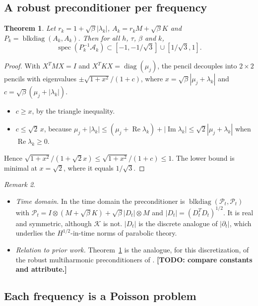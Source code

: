 \documentclass[11pt,a4paper]{article}
\newcommand{\A}{\mathcal{A}}
\newcommand{\todo}[1]{\textbf{[TODO: #1]}}
\newtheorem{theorem}{Theorem}[section]
\theoremstyle{remark}
\newtheorem{remark}[theorem]{Remark}
\begin{document}
\subsection{A robust preconditioner per frequency}

\begin{theorem}\label{thm:heatsz}
Let $r_k=1+\sqrt\beta|\lambda_k|$, $A_k=r_kM+\sqrt\beta K$ and $P_k=\operatorname{blkdiag}(A_k,A_k)$.
Then for all $h$, $\tau$, $\beta$ and $k$,
\[
\operatorname{spec}(P_k^{-1}\A_k)\subset[-1,-1/\sqrt3]\cup[1/\sqrt3,1].
\]
\end{theorem}
\begin{proof}
With $X^TMX=I$ and $X^TKX=\operatorname{diag}(\mu_j)$, the pencil decouples into
$2\times2$ pencils with eigenvalues $\pm\sqrt{1+x^2}/(1+c)$, where
$x=\sqrt\beta|\mu_j+\lambda_k|$ and $c=\sqrt\beta(\mu_j+|\lambda_k|)$.
\begin{itemize}
\item $c\ge x$, by the triangle inequality.
\item $c\le\sqrt2\,x$, because $\mu_j+|\lambda_k|\le(\mu_j+\operatorname{Re}\lambda_k)+|\operatorname{Im}\lambda_k|\le\sqrt2|\mu_j+\lambda_k|$
  when $\operatorname{Re}\lambda_k\ge0$.
\end{itemize}
Hence $\sqrt{1+x^2}/(1+\sqrt2x)\le\sqrt{1+x^2}/(1+c)\le1$. The lower bound is
minimal at $x=\sqrt2$, where it equals $1/\sqrt3$.
\end{proof}

\begin{remark}
\begin{itemize}
\item \emph{Time domain.} In the time domain the preconditioner is
  $\operatorname{blkdiag}(\mathcal P_t,\mathcal P_t)$ with
  $\mathcal P_t=I\otimes(M+\sqrt\beta K)+\sqrt\beta|D_t|\otimes M$ and $|D_t|=(D_t^TD_t)^{1/2}$.
  It is real and symmetric, although $\mathcal K$ is not. $|D_t|$ is the
  discrete analogue of $|\partial_t|$, which underlies the $H^{1/2}$-in-time
  norms of parabolic theory.
\item \emph{Relation to prior work.} Theorem~\ref{thm:heatsz} is the
  analogue, for this discretization, of the robust multiharmonic
  preconditioners of \cite{KK12,KKLWZ13}. \todo{compare constants and
  attribute.}
\end{itemize}
\end{remark}

\subsection{Each frequency is a Poisson problem}
\end{document}
